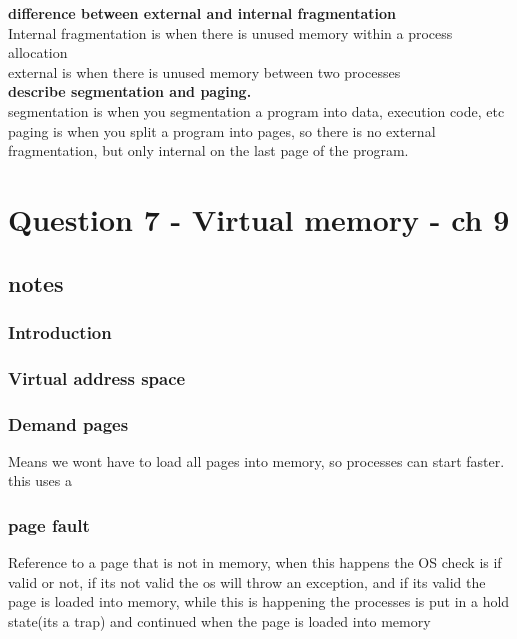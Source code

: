 \documentclass[a4paper,10pt,titlepage]{report}
\begin{document}
\vspace{5mm}
\textbf{difference between external and internal fragmentation}\\
\hspace{10mm} Internal fragmentation is when there is unused memory within a process allocation \\
\hspace{10mm} external is when there is unused memory between two processes \\

\vspace{5mm}
\textbf{describe segmentation and paging.}\\
\hspace{10mm} segmentation is when you segmentation a program into data, execution code, etc  \\
\hspace{10mm} paging is when you split a program into pages, so there is no external fragmentation, but only internal on the last page of the program.\\








\section{Question 7 - Virtual memory - ch 9}
\subsection{notes}


\subsubsection{Introduction}

\subsubsection{Virtual address space}

\subsubsection{Demand pages}
Means we wont have to load all pages into memory, so processes can start faster. this uses a 

\subsubsection{page fault}
Reference to a page that is not in memory, when this happens the OS check is if valid or not, if its not valid the os will throw an exception, and if its valid the page is loaded into memory, while this is happening the processes is put in a hold state(its a trap) and continued when the page is loaded into memory 
\end{document}
